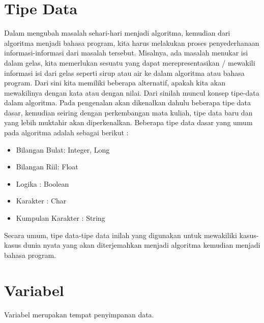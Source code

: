 \section{Tipe Data}
	Dalam mengubah masalah sehari-hari menjadi algoritma, kemudian dari algoritma menjadi bahasa program, kita harus melakukan proses penyederhanaan informasi-informasi dari masalah tersebut. Misalnya, ada masalah menukar isi dalam gelas, kita memerlukan sesuatu yang dapat merepresentasikan / mewakili informasi isi dari gelas seperti sirup atau air  ke dalam algoritma atau bahasa program. Dari sini kita memiliki beberapa alternatif, apakah kita akan mewakilinya dengan kata atau dengan nilai. Dari sinilah muncul konsep tipe-data dalam algoritma. Pada pengenalan akan dikenalkan dahulu beberapa tipe data dasar, kemudian seiring dengan perkembangan mata kuliah, tipe data baru dan yang lebih muktahir akan diperkenalkan. 
Beberapa tipe data dasar yang umum pada algoritma adalah sebagai berikut : 
\begin{itemize}
	\item Bilangan Bulat: Integer, Long
	\item	Bilangan Riil: Float
	\item	Logika : Boolean
	\item	Karakter  : Char
	\item	Kumpulan Karakter : String 
\end{itemize}
Secara umum, tipe data-tipe data inilah yang digunakan untuk mewakiliki kasus-kasus dunia nyata yang akan diterjemahkan menjadi algoritma kemudian menjadi bahasa program. 	


\section{Variabel}
Variabel merupakan tempat penyimpanan data. 

